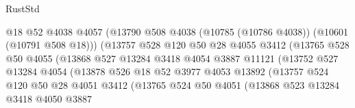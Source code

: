 \begin{lexlean}{RustStd}
\begin{coremodule}
                                  @18
                                  @52
                                  @4038
                                  @4057
                                  (@13790
                                    @508
                                    @4038
                                    (@10785 (@10786 @4038))
                                    (@10601 (@10791 @508 @18)))
                                  (@13757
                                    @528
                                    @120
                                    @50
                                    @28
                                    @4055
                                    @3412
                                    (@13765
                                      @528
                                      @50
                                      @4055
                                      (@13868
                                        @527
                                        @13284
                                        @3418
                                        @4054
                                        @3887
                                        @11121
                                        (@13752
                                          @527
                                          @13284
                                          @4054
                                          (@13878
                                            @526
                                            @18
                                            @52
                                            @3977
                                            @4053
                                            @13892
                                            (@13757
                                              @524
                                              @120
                                              @50
                                              @28
                                              @4051
                                              @3412
                                              (@13765
                                                @524
                                                @50
                                                @4051
                                                (@13868
                                                  @523
                                                  @13284
                                                  @3418
                                                  @4050
                                                  @3887

\end{coremodule}
\end{lexlean}
